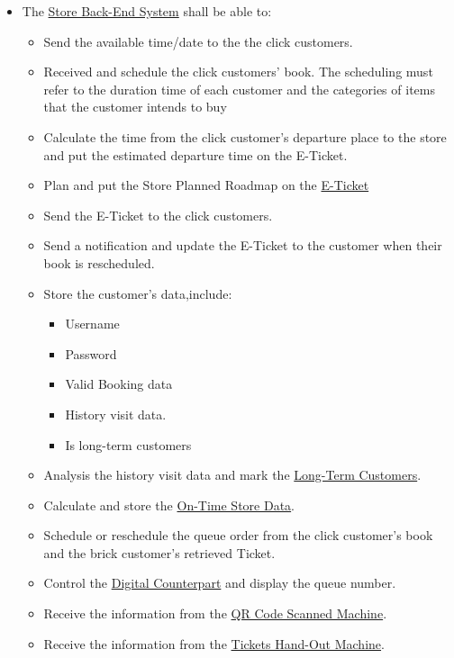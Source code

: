 \documentclass[a4paper,12pt]{report}
\begin{document}
\begin{itemize}
	\item The \hyperref[Definitions]{Store Back-End System} shall be able to:
	\begin{itemize}
		\item Send the available time/date to the the click customers.
		\item Received and schedule the click customers' book. The scheduling must refer to the duration time of each customer and the categories of items that the customer intends to buy
		\item Calculate the time from the click customer's departure place to the store and put the estimated departure time on the E-Ticket.
		\item Plan and put the Store Planned Roadmap on the \hyperref[Definitions]{E-Ticket}
		\item Send the  E-Ticket to the click customers.
		\item Send a notification and update the E-Ticket to the customer when their book is rescheduled.
		\item Store the customer's data,include:
		\begin{itemize}
			\item Username
			\item Password
			\item Valid Booking data
			\item History visit data.
			\item Is long-term customers
		\end{itemize}
		\item Analysis the history visit data and mark the \hyperref[Definitions]{Long-Term Customers}.
		\item Calculate and store the \hyperref[Definitions]{On-Time Store Data}.
		\item Schedule or reschedule the queue order from the click customer's book and the brick customer's retrieved Ticket.
		\item Control the \hyperref[Definitions]{Digital Counterpart} and display the queue number.
		\item Receive the information from the \hyperref[Definitions]{QR Code Scanned Machine}.
		\item Receive the information from the \hyperref[Definitions]{Tickets Hand-Out Machine}.
	\end{itemize}
\end{itemize}
\end{document}
